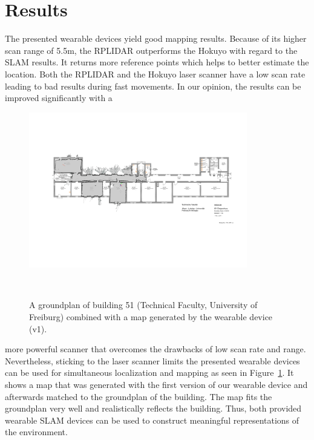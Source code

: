 \documentclass{sigchi-ext}
\begin{document}
\section{Results}
The presented wearable devices yield good mapping results. Because of its higher scan range of 5.5m, the RPLIDAR outperforms the Hokuyo with regard to the SLAM results. It returns more reference points which helps to better estimate the location. Both the RPLIDAR and the Hokuyo laser scanner have a low scan rate leading to bad results during fast movements. In our opinion, the results can be improved significantly with a 

\begin{figure}[!h]
	\hspace{1cm}
	\includegraphics[width=0.85\textwidth]{51.png}
	\caption{A groundplan of building 51 (Technical Faculty, University of Freiburg) combined with a map generated by the wearable device (v1).}~\label{fig:b51map}
\end{figure}

more powerful scanner that overcomes the drawbacks of low scan rate and range. Nevertheless, sticking to the laser scanner limits the presented wearable devices can be used for simultaneous localization and mapping as seen in Figure~\ref{fig:b51map}. It shows a map that was generated with the first version of our wearable device and afterwards matched to the groundplan of the building. The map fits the groundplan very well and realistically reflects the building. Thus, both provided wearable SLAM devices can be used to construct meaningful representations of the environment.






\balance{} 
\end{document}
